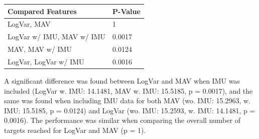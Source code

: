 		
\begin{center}
	\begin{tabular}{l l}
		\toprule
			\textbf{Compared Features} & \textbf{P-Value}\\
			\midrule
			LogVar, MAV & 1 \\
			LogVar w/ IMU, MAV w/ IMU & 0.0017 \\
			MAV, MAV w/ IMU & 0.0124 \\
			LogVar, LogVar w/ IMU & 0.0016 \\
			\bottomrule
	\end{tabular}
\end{center}

A significant difference was found between LogVar and MAV when IMU was included (LogVar w. IMU: 14.1481, MAV w. IMU: 15.5185, p = 0.0017), and the same was found when including IMU data for both MAV (wo. IMU: 15.2963, w. IMU: 15.5185, p = 0.0124) and LogVar (wo. IMU: 15.2593, w. IMU: 14.1481, p = 0.0016). The performance was similar when comparing the overall number of targets reached for LogVar and MAV (p = 1).